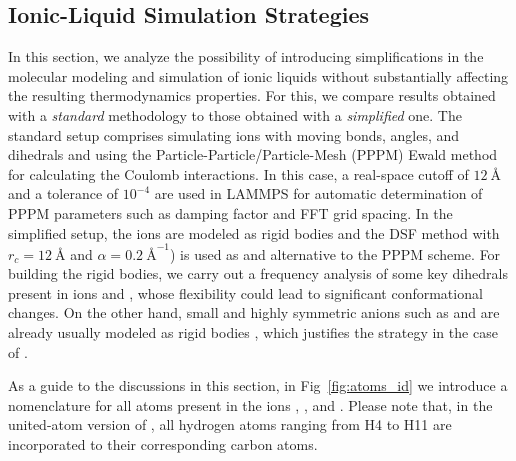 \documentclass[3p,twocolumn]{elsarticle}
\begin{document}
\subsection{Ionic-Liquid Simulation Strategies}
\label{sec:prel_results}

In this section, we analyze the possibility of introducing simplifications in the molecular modeling and simulation of ionic liquids without substantially affecting the resulting thermodynamics properties.
For this, we compare results obtained with a \textit{standard} methodology to those obtained with a \textit{simplified} one.
The standard setup comprises simulating ions with moving bonds, angles, and dihedrals and using the Particle-Particle/Particle-Mesh (PPPM) Ewald method \cite{Hockney_1988} for calculating the Coulomb interactions.
In this case, a real-space cutoff of $12~\text{\AA}$ and a tolerance of $10^{-4}$ are used in LAMMPS for automatic determination of PPPM parameters such as damping factor and FFT grid spacing.
In the simplified setup, the ions are modeled as rigid bodies and the DSF method \cite{Fennell2006} with $r_c = 12 ~\text{\AA}$ and $\alpha = 0.2 ~\text{\AA}^{-1}$) is used as and alternative to the PPPM scheme.
For building the rigid bodies, we carry out a frequency analysis of some key dihedrals present in ions \ce{[emim]^+} and \ce{[NTf_2]^-}, whose flexibility could lead to significant conformational changes.
On the other hand, small and highly symmetric anions such as  and  are already usually modeled as rigid bodies \cite{HANKE_2001,Hanke_2003,Lynden_Bell_2006}, which justifies the strategy in the case of \ce{[B(CN)_4]^-}.

As a guide to the discussions in this section, in Fig~\ref{fig:atoms_id} we introduce a nomenclature for all atoms present in the ions \ce{[emim]^+}, \ce{[B(CN)_4]^-}, and \ce{[NTf_2]^-}.
Please note that, in the united-atom version of \ce{[emim]^+}, all hydrogen atoms ranging from H4 to H11 are incorporated to their corresponding carbon atoms.
\end{document}
